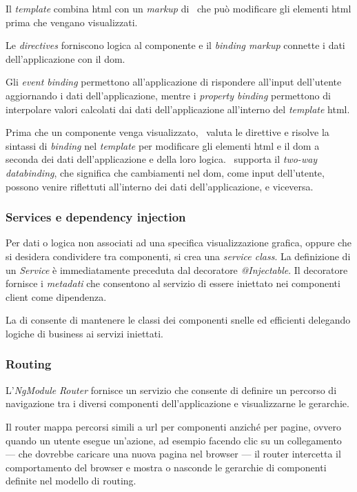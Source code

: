 Il \textit{template} combina \acrshort{html} con un \textit{markup} di \angular~che può modificare gli elementi \acrshort{html} prima che vengano visualizzati.

Le \textit{directives} forniscono logica al componente e il \textit{binding markup} connette i dati dell'applicazione con il \gls{dom}.

Gli \textit{event binding} permettono all'applicazione di rispondere all'input dell'utente aggiornando i dati dell'applicazione, mentre i \textit{property binding} permettono di interpolare valori calcolati dai dati dell'applicazione all'interno del \textit{template} \acrshort{html}.

Prima che un componente venga visualizzato, \angular~valuta le direttive e risolve la sintassi di \textit{binding} nel \textit{template} per modificare gli elementi \acrshort{html} e il \acrshort{dom} a seconda dei dati dell'applicazione e della loro logica. \angular~supporta il \textit{two-way databinding}, che significa che cambiamenti nel \acrshort{dom}, come input dell'utente, possono venire riflettuti all'interno dei dati dell'applicazione, e viceversa.

\subsubsection{Services e dependency injection}
\label{chap:client:services}
Per dati o logica non associati ad una specifica visualizzazione grafica, oppure che si desidera condividere tra componenti, si crea una \textit{service class}. La definizione di un \textit{Service} è immediatamente preceduta dal decoratore \textit{@Injectable}. Il decoratore fornisce i \textit{metadati} che consentono al servizio di essere iniettato nei componenti client come dipendenza.

La \gls{di}  consente di mantenere le classi dei componenti snelle ed efficienti delegando logiche di business ai servizi iniettati.

\subsubsection{Routing}

L'\textit{NgModule} \textit{Router} fornisce un servizio che consente di definire un percorso di navigazione tra i diversi componenti dell'applicazione e visualizzarne le gerarchie.

Il router mappa percorsi simili a \acrshort{url} per componenti anziché per pagine, ovvero quando un utente esegue un'azione, ad esempio facendo clic su un collegamento --- che dovrebbe caricare una nuova pagina nel browser --- il router intercetta il comportamento del browser e mostra o nasconde le gerarchie di componenti definite nel modello di routing.

